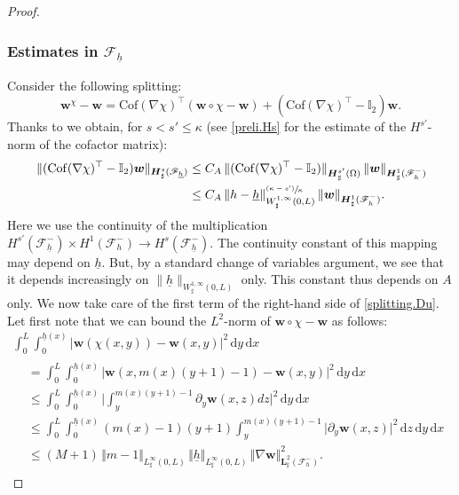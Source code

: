 \documentclass[JEP,XML,SOM,Unicode,NoFloatCountersInSection]{cedram}
\let\mathcal\mathscr
\newcommand{\psfrac}[2]{\sfrac{(#1)}{#2}}
\theoremstyle{remark}
\theoremstyle{definition}
\newcommand{\norme}[1]{\,\Vert #1\Vert}
\newcommand{\dd}{\,\mathrm{d}}
\newcommand{\wg}{\boldsymbol{w}}
\newcommand{\BS}[1]{\boldsymbol{#1}}
\let\CM\Omega
\newcommand{\hb}{{\underline{h}}}
\newcommand{\Cof}{\mathrm{Cof}}
\begin{document}
\begin{proof}
\subsubsection*{Estimates in $\mathcal{F}_{\hb}$}
Consider the following splitting:
\begin{equation}\label{splitting.Du}
\wg^\chi - \wg = \Cof(\nabla\chi)^{\top}(\wg\circ\chi - \wg) +(\Cof(\nabla\chi)^{\top}-\mathbb I_2)\wg.
\end{equation}
Thanks to \cite[Prop.\,B.1]{Grubsolo} we obtain, for $s<s'\leq \kappa$ (see \eqref{preli.Hs} for the estimate of the $H^{s'}$-norm of the cofactor matrix):
\[
\begin{aligned}
\norme{(\Cof(\nabla\chi)^{\top}-\mathbb I_2)\wg}_{ \BS{H}^{s}_{\sharp}(\mathcal{F}_{\hb})}&\leq C_{A} \norme{(\Cof(\nabla\chi)^{\top}-\mathbb I_2)}_{ \BS{H}^{s'}_{\sharp}(\CM)}\norme{\wg}_{\BS{H}^{1}_{\sharp}(\mathcal{F}^{-}_{h})}\\
&\leq C_A \norme{h-\hb}_{W^{1,\infty}_{\sharp}(0,L)}^{\psfrac{\kappa-s'}{\kappa}}\norme{\wg}_{\BS{H}^{1}_{\sharp}(\mathcal{F}^{-}_{h})}.
\end{aligned}
\]
Here we use the continuity of the
multiplication
$H^{s'}(\mathcal F^{-}_{\hb}) \times H^{1}(\mathcal F^{-}_{h}) \to
H^{s}(\mathcal F^{-}_{\hb})$. The continuity constant of this mapping
may depend on $\hb$. But, by a standard change of variables argument, we see that it depends increasingly on $\|\hb\|_{W^{1,\infty}_{\sharp}(0,L)}$ only. This constant thus depends on $A$ only.
We now take care of the first term of the right-hand side of \eqref{splitting.Du}.
Let first note that we can bound the $L^2$-norm of $\wg \circ \chi - \wg$ as follows:
\begin{multline*}
\int_{0}^{L}\int_{0}^{\hb(x)}\vert\wg(\chi(x,y)) - \wg(x,y)\vert^{2}\dd y\dd x
\\
\begin{aligned}
& =\int_{0}^{L}\int_{0}^{\hb(x)}\vert \wg(x,m(x)(y+1)-1)-\wg(x,y)\vert^{2}\dd y\dd x\\
&\leq \int_{0}^{L}\int_{0}^{\hb(x)}\biggl\vert \int_{y}^{m(x)(y+1)-1}\partial_y\wg(x,z)dz\biggr\vert^{2}\dd y\dd x\\
&\leq \int_{0}^{L}\int_{0}^{\hb(x)}(m(x)-1)(y+1)\int_{y}^{m(x)(y+1)-1}\vert \partial_y\wg(x,z)\vert^{2}\dd z\dd y\dd x\\
&\leq (M+1)\norme{m-1}_{L^{\infty}_{\sharp}(0,L)}\norme{\hb}_{L^{\infty}_{\sharp}(0,L)}\norme{\nabla\wg}_{\BS{L}^{2}_{\sharp}(\mathcal{F}^{-}_{h})}^{2}.
\end{aligned}
\end{multline*}

\end{proof}
\end{document}
